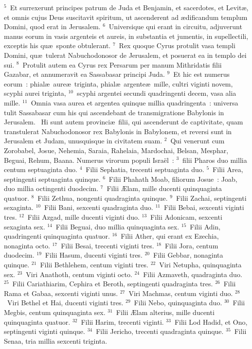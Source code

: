 ${}^{5}$~Et surrexerunt principes patrum de Juda et Benjamin, et sacerdotes, et Levit\ae , et omnis cujus Deus suscitavit spiritum, ut ascenderent ad \ae dificandum templum Domini, quod erat in Jerusalem.
${}^{6}$~Universique qui erant in circuitu, adjuverunt manus eorum in vasis argenteis et aureis, in substantia et jumentis, in supellectili, exceptis his qu\ae\ sponte obtulerant.
${}^{7}$~Rex quoque Cyrus protulit vasa templi Domini, qu\ae\ tulerat Nabuchodonosor de Jerusalem, et posuerat ea in templo dei sui.
${}^{8}$~Protulit autem ea Cyrus rex Persarum per manum Mithridatis filii Gazabar, et annumeravit ea Sassabasar principi Juda.
${}^{9}$~Et hic est numerus eorum~: phial\ae\ aure\ae\ triginta, phial\ae\ argente\ae\ mille, cultri viginti novem, scyphi aurei triginta,
${}^{10}$~scyphi argentei secundi quadringenti decem, vasa alia mille.
${}^{11}$~Omnia vasa aurea et argentea quinque millia quadringenta~: universa tulit Sassabasar cum his qui ascendebant de transmigratione Babylonis in Jerusalem.
~Hi sunt autem provinci\ae\ filii, qui ascenderunt de captivitate, quam transtulerat Nabuchodonosor rex Babylonis in Babylonem, et reversi sunt in Jerusalem et Judam, unusquisque in civitatem suam.
${}^{2}$~Qui venerunt cum Zorobabel, Josue, Nehemia, Saraia, Rahelaia, Mardochai, Belsan, Mesphar, Beguai, Rehum, Baana. Numerus virorum populi Isra\"el~:
${}^{3}$~filii Pharos duo millia centum septuaginta duo.
${}^{4}$~Filii Sephatia, trecenti septuaginta duo.
${}^{5}$~Filii Area, septingenti septuaginta quinque.
${}^{6}$~Filii Phahath Moab, filiorum Josue~: Joab, duo millia octingenti duodecim.
${}^{7}$~Filii \AE lam, mille ducenti quinquaginta quatuor.
${}^{8}$~Filii Zethua, nongenti quadraginta quinque.
${}^{9}$~Filii Zachai, septingenti sexaginta.
${}^{10}$~Filii Bani, sexcenti quadraginta duo.
${}^{11}$~Filii Bebai, sexcenti viginti tres.
${}^{12}$~Filii Azgad, mille ducenti viginti duo.
${}^{13}$~Filii Adonicam, sexcenti sexaginta sex.
${}^{14}$~Filii Beguai, duo millia quinquaginta sex.
${}^{15}$~Filii Adin, quadringenti quinquaginta quatuor.
${}^{16}$~Filii Ather, qui erant ex Ezechia, nonaginta octo.
${}^{17}$~Filii Besai, trecenti viginti tres.
${}^{18}$~Filii Jora, centum duodecim.
${}^{19}$~Filii Hasum, ducenti viginti tres.
${}^{20}$~Filii Gebbar, nonaginta quinque.
${}^{21}$~Filii Bethlehem, centum viginti tres.
${}^{22}$~Viri Netupha, quinquaginta sex.
${}^{23}$~Viri Anathoth, centum viginti octo.
${}^{24}$~Filii Azmaveth, quadraginta duo.
${}^{25}$~Filii Cariathiarim, Cephira et Beroth, septingenti quadraginta tres.
${}^{26}$~Filii Rama et Gabaa, sexcenti viginti unus.
${}^{27}$~Viri Machmas, centum viginti duo.
${}^{28}$~Viri Bethel et Hai, ducenti viginti tres.
${}^{29}$~Filii Nebo, quinquaginta duo.
${}^{30}$~Filii Megbis, centum quinquaginta sex.
${}^{31}$~Filii \AE lam alterius, mille ducenti quinquaginta quatuor.
${}^{32}$~Filii Harim, trecenti viginti.
${}^{33}$~Filii Lod Hadid, et Ono, septingenti viginti quinque.
${}^{34}$~Filii Jericho, trecenti quadraginta quinque.
${}^{35}$~Filii Senaa, tria millia sexcenti triginta.


